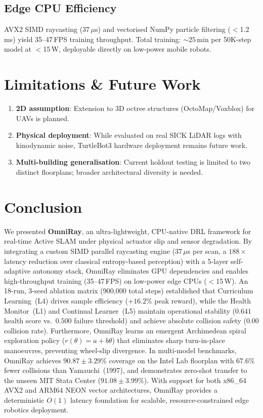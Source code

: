 \documentclass[conference]{IEEEtran}
\begin{document}
\subsection{Edge CPU Efficiency}
AVX2 SIMD raycasting ($37\,\mu$s) and vectorised NumPy particle filtering ($<$1.2\,ms) yield 35--47\,FPS training throughput.
Total training: ${\sim}25$\,min per 50K-step model at $<$15\,W, deployable directly on low-power mobile robots.

\section{Limitations \& Future Work}
\begin{enumerate}
    \item \textbf{2D assumption}: Extension to 3D octree structures (OctoMap/Voxblox) for UAVs is planned.
    \item \textbf{Physical deployment}: While evaluated on real SICK LiDAR logs with kinodynamic noise, TurtleBot3 hardware deployment remains future work.
    \item \textbf{Multi-building generalisation}: Current holdout testing is limited to two distinct floorplans; broader architectural diversity is needed.
\end{enumerate}

\section{Conclusion}
We presented \textbf{OmniRay}, an ultra-lightweight, CPU-native DRL framework for real-time Active SLAM under physical actuator slip and sensor degradation.
By integrating a custom SIMD parallel raycasting engine ($37\,\mu$s per scan, a $188\times$ latency reduction over classical entropy-based perception) with a 5-layer self-adaptive autonomy stack, OmniRay eliminates GPU dependencies and enables high-throughput training (35--47\,FPS) on low-power edge CPUs ($<$15\,W).
An 18-run, 3-seed ablation matrix (900{,}000 total steps) established that Curriculum Learning~(L4) drives sample efficiency ($+16.2\%$ peak reward), while the Health Monitor~(L1) and Continual Learner~(L5) maintain operational stability ($0.641$ health score vs.\ $0.500$ failure threshold) and achieve absolute collision safety ($0.00$ collision rate).
Furthermore, OmniRay learns an emergent Archimedean spiral exploration policy ($r(\theta) = a + b\theta$) that eliminates sharp turn-in-place manoeuvres, preventing wheel-slip divergence.
In multi-model benchmarks, OmniRay achieves $90.87 \pm 3.29\%$ coverage on the Intel Lab floorplan with $67.6\%$ fewer collisions than Yamauchi~(1997), and demonstrates zero-shot transfer to the unseen MIT Stata Center ($91.08 \pm 3.99\%$).
With support for both x86\_64 AVX2 and ARM64 NEON vector architectures, OmniRay provides a deterministic $O(1)$ latency foundation for scalable, resource-constrained edge robotics deployment.
\end{document}
